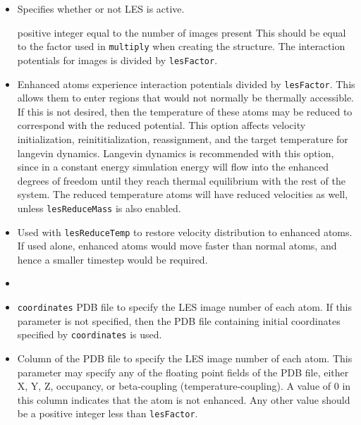 \begin{itemize}

\item
{}
{Specifies whether or not LES is active.}

{positive integer equal to the number of images present}
{This should be equal to the factor used in {\tt multiply}
 when creating the structure.  The interaction potentials for images is
 divided by {\tt lesFactor}.  
}

\item
{}
{Enhanced atoms experience interaction potentials divided by {\tt lesFactor}.
This allows them to enter regions that would not normally be thermally
accessible.  If this is not desired, then the temperature of these atoms
may be reduced to correspond with the reduced potential.  This option
affects velocity initialization, reinititialization, reassignment, and
the target temperature for langevin dynamics.  Langevin dynamics is
recommended with this option, since in a constant energy simulation energy
will flow into the enhanced degrees of freedom until they reach thermal
equilibrium with the rest of the system.  The reduced temperature atoms
will have reduced velocities as well, unless {\tt lesReduceMass} is also
enabled.}

\item
{}
{Used with {\tt lesReduceTemp} to restore velocity distribution to
enhanced atoms.  If used alone, enhanced atoms would move faster than
normal atoms, and hence a smaller timestep would be required.}

\item
\item
{} {{\tt coordinates}}
{PDB file to specify the LES image number of each atom.
If this parameter is not specified, then 
the PDB file containing initial coordinates specified by 
{\tt coordinates} is used.}

\item
{}
{Column of the PDB file to specify the LES image number of each atom.
This parameter may specify any of the floating point fields of the PDB file, 
either X, Y, Z, occupancy, or beta-coupling (temperature-coupling).  
A value of 0 in this column indicates that the atom is not enhanced.
Any other value should be a positive integer less than {\tt lesFactor}.}

\end{itemize}


